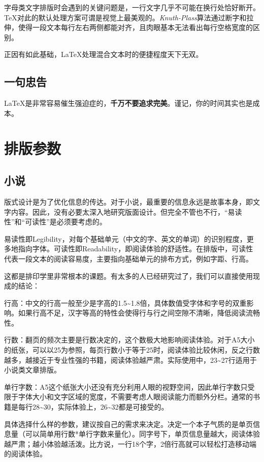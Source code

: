 \documentclass[10pt,openany]{book}
\begin{document}
\begin{sloppypar}
字母类文字排版时会遇到的关键问题是，一行文字几乎不可能在换行处恰好断开。{\TeX}对此的默认处理方案可谓是视觉上最美观的。\textit{Knuth-Plass}算法通过断字和拉伸，使得一段文本每行左右两侧都能对齐，且肉眼基本无法看出每行空格宽度的区别。

正因有如此基础，{\LaTeX}处理混合文本时的便捷程度天下无双。

\section{一句忠告}

 {\LaTeX}是非常容易催生强迫症的，\textbf{千万不要追求完美}。谨记，你的时间其实也是成本。

\chapter{排版参数}

\section{小说}

版式设计是为了优化信息的传达。对于小说，最重要的信息永远是故事本身，即文字内容。因此，没有必要太深入地研究版面设计。但完全不管也不行，“易读性”和“可读性”是必须要考虑的。

易读性即Legibility，对每个基础单元（中文的字、英文的单词）的识别程度，更多地指向字体。可读性即Readability，即阅读体验的舒适性。在排版中，可读性代表一段文本的阅读容易度，主要指向基础单元的排布方式，例如字距、行高。

这都是排印学里非常根本的课题。有太多的人已经研究过了，我们可以直接使用现成的结论：

行高：中文的行高一般至少是字高的1.5\textasciitilde1.8倍，具体数值受字体和字号的双重影响。如果行高不足，汉字等高的特性会使得行与行之间空隙不清晰，降低阅读流畅性。

行数：翻页的频次主要是行数决定的，这个数极大地影响阅读体验。对于A5大小的纸张，可以以25为参照，每页行数小于等于25时，阅读体验比较休闲，反之行数越多，越接近于专业性强的书籍，阅读体验越严肃。实际使用中，23\textasciitilde27行适用于小说类文章排版。

单行字数：A5这个纸张大小还没有充分利用人眼的视野空间，因此单行字数只受限于字体大小和文字区域的宽度，不需要考虑人眼阅读能力而额外分栏。通常的书籍是每行28\textasciitilde30，实际体验上，26\textasciitilde32都是可接受的。

\blankpar

具体选择什么样的参数，建议按自己的需求来决定。决定一个本子气质的是单页信息量（可以简单用行数*单行字数来量化）。同字号下，单页信息量越大，阅读体验越严肃；越小体验越活泼。比方说，一行18个字，2倍行高就可以轻松打造移动端的阅读体验。


\end{sloppypar}
\end{document}
